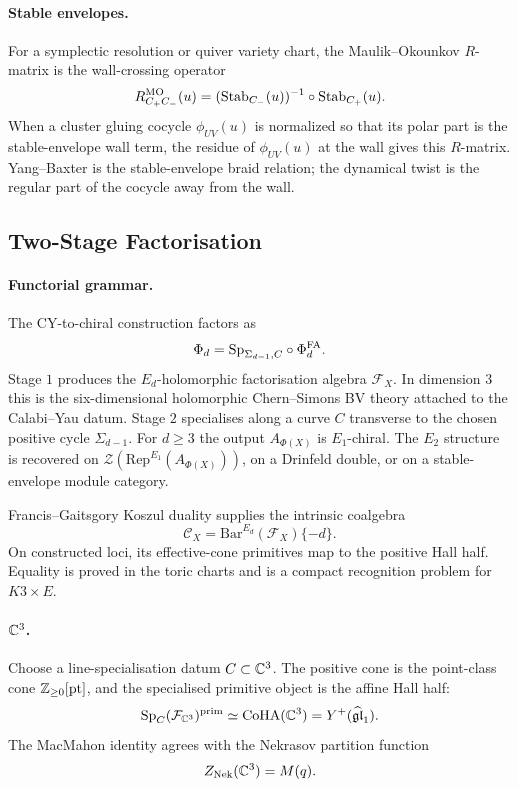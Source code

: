 \paragraph{Stable envelopes.}
For a symplectic resolution or quiver variety chart, the
Maulik--Okounkov \(R\)-matrix is the wall-crossing operator
\[
  R^{\mathrm{MO}}_{C_+C_-}(u)
  =(\mathrm{Stab}_{C_-}(u))^{-1}\circ\mathrm{Stab}_{C_+}(u).
\]
When a cluster gluing cocycle \(\phi_{UV}(u)\) is normalized so that
its polar part is the stable-envelope wall term, the residue of
\(\phi_{UV}(u)\) at the wall gives this \(R\)-matrix. Yang--Baxter is
the stable-envelope braid relation; the dynamical twist is the regular
part of the cocycle away from the wall.

\subsection*{Two-Stage Factorisation}

\paragraph{Functorial grammar.}
The CY-to-chiral construction factors as
\[
  \Phi_d=\mathrm{Sp}_{\Sigma_{d-1},C}\circ\Phi^{\mathrm{FA}}_d.
\]
Stage \(1\) produces the \(E_d\)-holomorphic factorisation algebra
\(\mathcal F_X\). In dimension \(3\) this is the six-dimensional
holomorphic Chern--Simons BV theory attached to the Calabi--Yau datum.
Stage \(2\) specialises along a curve \(C\) transverse to the chosen
positive cycle \(\Sigma_{d-1}\). For \(d\ge3\) the output
\(A_{\Phi(X)}\) is \(E_1\)-chiral. The \(E_2\) structure is recovered on
\(\mathcal Z(\mathrm{Rep}^{E_1}(A_{\Phi(X)}))\), on a Drinfeld double,
or on a stable-envelope module category.

Francis--Gaitsgory Koszul duality supplies the intrinsic coalgebra
\[
  \mathcal C_X=\mathrm{Bar}^{E_d}(\mathcal F_X)\{-d\}.
\]
On constructed loci, its effective-cone primitives map to the positive
Hall half. Equality is proved in the toric charts and is a compact
recognition problem for \(K3\times E\).

\paragraph{\(\mathbb{C}^3\).}
Choose a line-specialisation datum \(C\subset\mathbb{C}^3\). The positive cone
is the point-class cone \(\mathbb{Z}_{\ge0}[\mathrm{pt}]\), and the specialised
primitive object is the affine Hall half:
\[
  \mathrm{Sp}_C(\mathcal F_{\mathbb{C}^3})^{\mathrm{prim}}
  \simeq
  \mathrm{CoHA}(\mathbb{C}^3)
  =
  Y^{+}(\widehat{\mathfrak{gl}}_1).
\]
The MacMahon identity agrees with the Nekrasov partition function
\[
  Z_{\mathrm{Nek}}(\mathbb{C}^3)=M(q).
\]

